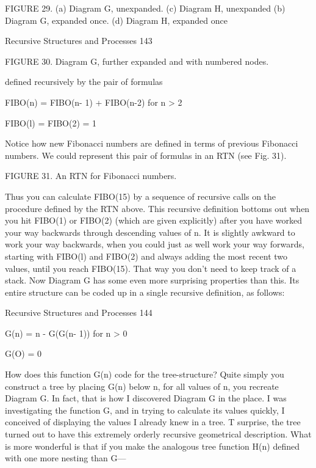 FIGURE 29. (a) Diagram G, unexpanded.                (c) Diagram H, unexpanded
           (b) Diagram G, expanded once.             (d) Diagram H, expanded once




Recursive Structures and Processes                                                      143

             FIGURE 30. Diagram G, further expanded and with numbered nodes.

       defined recursively by the pair of formulas

       FIBO(n) = FIBO(n- 1) + FIBO(n-2)              for n > 2

              FIBO(l) = FIBO(2) = 1

Notice how new Fibonacci numbers are defined in terms of previous Fibonacci numbers.
We could represent this pair of formulas in an RTN (see Fig. 31).




                         FIGURE 31. An RTN for Fibonacci numbers.


Thus you can calculate FIBO(15) by a sequence of recursive calls on the procedure
defined by the RTN above. This recursive definition bottoms out when you hit FIBO(1)
or FIBO(2) (which are given explicitly) after you have worked your way backwards
through descending values of n. It is slightly awkward to work your way backwards,
when you could just as well work your way forwards, starting with FIBO(l) and FIBO(2)
and always adding the most recent two values, until you reach FIBO(15). That way you
don't need to keep track of a stack.
        Now Diagram G has some even more surprising properties than this. Its entire
structure can be coded up in a single recursive definition, as follows:


Recursive Structures and Processes                                               144

       G(n) = n - G(G(n- 1)) for n > 0

               G(O) = 0

How does this function G(n) code for the tree-structure? Quite simply you construct a
tree by placing G(n) below n, for all values of n, you recreate Diagram G. In fact, that is
how I discovered Diagram G in the place. I was investigating the function G, and in
trying to calculate its values quickly, I conceived of displaying the values I already knew
in a tree. T surprise, the tree turned out to have this extremely orderly recursive
geometrical description.
        What is more wonderful is that if you make the analogous tree function H(n)
defined with one more nesting than G—

